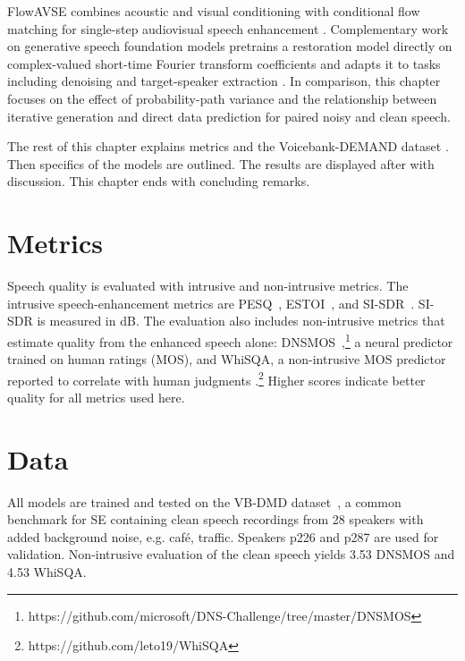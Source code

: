 FlowAVSE combines acoustic and visual conditioning with conditional flow matching for single-step audiovisual speech enhancement \citep{jungFlowAVSEEfficientAudioVisual2024}. Complementary work on generative speech foundation models pretrains a restoration model directly on complex-valued short-time Fourier transform coefficients and adapts it to tasks including denoising and target-speaker extraction \citep{kuGenerativeSpeechFoundation2025}. In comparison, this chapter focuses on the effect of probability-path variance and the relationship between iterative generation and direct data prediction for paired noisy and clean speech.


The rest of this chapter explains metrics and the Voicebank-DEMAND dataset \citep{valentini2016investigating}. Then specifics of the models are outlined. The results are displayed after with discussion. This chapter ends with concluding remarks.

\section{Metrics}
Speech quality is evaluated with intrusive and non-intrusive metrics. The intrusive speech-enhancement metrics are \ac{PESQ}~\citep{rixPerceptualEvaluationSpeech2001}, \ac{ESTOI}~\citep{jensen2016algorithm}, and \ac{SI-SDR}~\citep{leroux2018sdr}. SI-SDR is measured in dB. The evaluation also includes non-intrusive metrics that estimate quality from the enhanced speech alone: DNSMOS~\citep{reddy2021dnsmos},\footnote{https://github.com/microsoft/DNS-Challenge/tree/master/DNSMOS} a neural predictor trained on human ratings (\ac{MOS}), and WhiSQA, a non-intrusive \ac{MOS} predictor reported to correlate with human judgments \citep{closeHallucinationPerceptualMetricDriven2024,close2025whisqanonintrusivespeechquality}.\footnote{https://github.com/leto19/WhiSQA} Higher scores indicate better quality for all metrics used here.


\section{Data}
All models are trained and tested on the \ac{VB-DMD} dataset~\citep{valentini2016investigating}, a common benchmark for \ac{SE} containing clean speech recordings from 28 speakers with added background noise, e.g. caf\'e, traffic. Speakers p226 and p287 are used for validation. Non-intrusive evaluation of the clean speech yields 3.53 DNSMOS and 4.53 WhiSQA.

